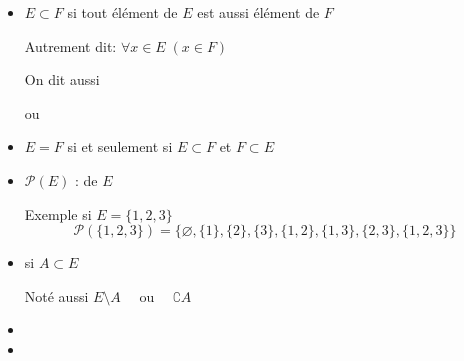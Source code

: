 \begin{frame}
\begin{itemize}
  \item<1->  $E \subset F$ si tout élément de $E$ est aussi élément de $F$

Autrement dit: \; $\forall x \in E \; (x \in F)$

\pause

On dit aussi

 ou 

\bigskip
\pause

  \item {}  $E = F$ si et seulement si $E \subset F$ et $F \subset E$

\bigskip
\pause

  \item $\mathcal{P}(E)$ :  de $E$

\bigskip
\pause

Exemple si $E= \{1,2,3\}$ 
$$\mathcal{P}(\{1,2,3\}) = 
\big\{ \varnothing, \{1\}, \{2\}, \{3\}, \{1,2\}, \{1,3\}, \{2,3\}, \{1,2,3\} \big\}$$
\end{itemize}
\end{frame}


\begin{frame}
\begin{itemize}
  \item {} si $A \subset E$

\smallskip
\pause

\begin{minipage}{0.5\textwidth}
\end{minipage}
\pause
\begin{minipage}{0.4\textwidth}
Noté aussi $E \setminus A$ \ \  ou \ \ $\complement A$ 
\end{minipage}


\pause

  \item {}

\pause


  \pause
  \item {} 

\end{itemize}

\end{frame}

